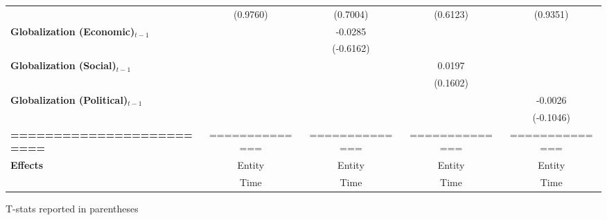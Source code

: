 \begin{center}
\begin{tabular}{lcccc}
\textbf{ }                         &    (0.9760)    &     (0.7004)     &     (0.6123)     &     (0.9351)      \\
\textbf{Globalization (Economic)$_{t-1}$}             &                &     -0.0285      &                  &                   \\
\textbf{ }                         &                &    (-0.6162)     &                  &                   \\
\textbf{Globalization (Social)$_{t-1}$}             &                &                  &      0.0197      &                   \\
\textbf{ }                         &                &                  &     (0.1602)     &                   \\
\textbf{Globalization (Political)$_{t-1}$}             &                &                  &                  &     -0.0026       \\
\textbf{ }                         &                &                  &                  &    (-0.1046)      \\
\textbf{=========================} & ============== &  ==============  &  ==============  &  ==============   \\
\textbf{Effects}                   &     Entity     &      Entity      &      Entity      &      Entity       \\
\textbf{}                          &      Time      &       Time       &       Time       &       Time        \\
\bottomrule
\end{tabular}
\end{center}

T-stats reported in parentheses